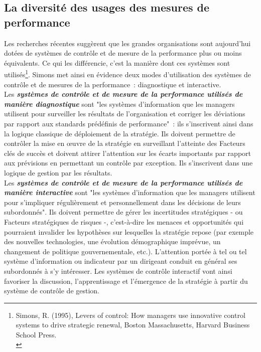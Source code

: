 \documentclass{kaobook}
\begin{document}
\subsection{La diversité des usages des mesures de performance}
\label{sec:org0136023}
Les recherches récentes suggèrent que les grandes organisations sont aujourd'hui dotées de systèmes de contrôle et de mesure de la performance plus ou moins équivalents. Ce qui les différencie, c'est la manière dont ces systèmes sont utilisés\footnote{Simons, R. (1995), Levers of control: How managers use innovative control systems to drive strategic renewal, Boston Massachusetts, Harvard Business School Press.\\}. Simons met ainsi en évidence deux modes d'utilisation des systèmes de contrôle et de mesures de la performance : diagnostique et interactive.\\

Les \emph{\textbf{systèmes de contrôle et de mesure de la performance utilisés de manière diagnostique}} sont "les systèmes d'information que les managers utilisent pour surveiller les résultats de l'organisation et corriger les déviations par rapport aux standards prédéfinis de performance" : ils s'inscrivent ainsi dans la logique classique de déploiement de la stratégie. Ils doivent permettre de contrôler la mise en œuvre de la stratégie en surveillant l'atteinte des Facteurs clés de succès et doivent attirer l'attention sur les écarts importants par rapport aux prévisions en permettant un contrôle par exception. Ils s'inscrivent dans une logique de gestion par les résultats.\\

Les \emph{\textbf{systèmes de contrôle et de mesure de la performance utilisés de manière interactive}} sont "les systèmes d'information que les managers utilisent pour s'impliquer régulièrement et personnellement dans les décisions de leurs subordonnés". Ils doivent permettre de gérer les incertitudes stratégiques - ou Facteurs stratégiques de risques -, c'est-à-dire les menaces et opportunités qui pourraient invalider les hypothèses sur lesquelles la stratégie repose (par exemple des nouvelles technologies, une évolution démographique imprévue, un changement de politique gouvernementale, etc.). L'attention portée à tel ou tel système d'information ou indicateur par un dirigeant conduit en général ses subordonnés à s'y intéresser. Les systèmes de contrôle interactif vont ainsi favoriser la discussion, l'apprentissage et l'émergence de la stratégie à partir du système de contrôle de gestion.\\
\end{document}
